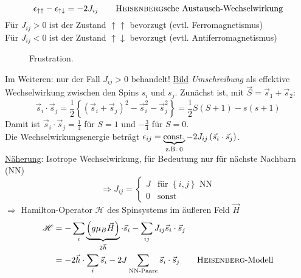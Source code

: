 \begin{equation}
    \epsilon_{\uparrow \uparrow} - \epsilon_{\uparrow \downarrow} = - 2 J_{ij} \qquad \text{\textsc{Heisenberg}sche Austausch-Wechselwirkung}
\end{equation}
Für $J_{ij} > 0$ ist der Zustand $\uparrow \uparrow$ bevorzugt (evtl. Ferromagnetismus) \\
Für $J_{ij} < 0$ ist der Zustand $\uparrow \downarrow$ bevorzugt (evtl. Antiferromagnetismus)
\begin{figure}[H]
        \centering
        \def\svgwidth{0.6\textwidth}
        
        \caption{Frustration.}
        \label{img:Frustration}
\end{figure}
Im Weiteren: nur der Fall $J_{ij} > 0$ behandelt!
\underline{Bild} \emph{Umschreibung} als effektive Wechselwirkung zwischen den Spins $s_i$ und $s_j$. Zunächst ist,
mit $\vec{S} = \vec{s}_1 + \vec{s}_2$:
\begin{equation}
    \vec{s}_i \cdot \vec{s}_j = \frac{1}{2} \left\{ \left( \vec{s}_i + \vec{s}_j \right)^2 - \vec{s}_i^2 - \vec{s}_j^2  \right\} = \frac{1}{2} S (S + 1) - s(s+1)
\end{equation}
Damit ist $\vec{s}_i \cdot \vec{s}_j = \frac{1}{4} $ für $S = 1$ und $-\frac{3}{4}$ für $S = 0$. \\
Die Wechselwirkungsenergie beträgt $\epsilon_{ij} = \underbrace{\text{const.}}_{\text{z.B. } 0} - 2 J_{ij} \left( \vec{s}_i \cdot \vec{s}_j  \right) $.\\
\underline{Näherung}: Isotrope Wechselwirkung, für Bedeutung nur für nächste Nachbarn (NN)
\begin{equation}
    \Rightarrow J_{ij} =
    \begin{cases}
        J & \text{für } \left\{ i, j \right\} \text{ NN} \\
        0 & \text{sonst}
    \end{cases}
\end{equation}
$\Rightarrow$ Hamilton-Operator $\mathscr{H}$ des Spinsystems im äußeren Feld $\vec{H}$
\begin{equation}
    \begin{split}
        \mathscr{H} &= - \sum_i \underbrace{\left( g \mu_B \vec{H} \right)}_{2 \vec{h}} \cdot \vec{s}_i - \sum_{ij} J_{ij} \vec{s}_i \cdot \vec{s}_j \\
        &= - 2 \vec{h} \cdot \sum_i \vec{s}_i - 2 J \sum_{\text{NN-Paare}} \vec{s}_i \cdot \vec{s}_j \qquad \text{\textsc{Heisenberg}-Modell}
    \end{split}
\end{equation}
